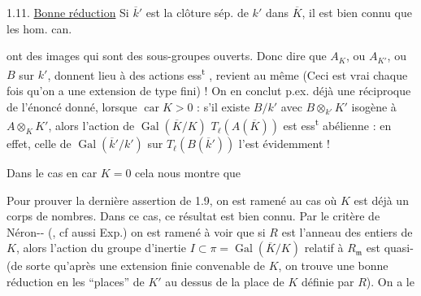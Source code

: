 
1.11. \uline{Bonne réduction}  Si $\overline k'$ est la clôture sép. de $k'$ dans $\overline K$, il est bien connu que les hom. can.

ont des images qui sont des sous-groupes ouverts. Donc  dire que $A_K$, ou $A_{K'}$, ou $B$ sur $k'$, donnent lieu à des actions ess\textsuperscript{t}   , revient au même (Ceci est vrai chaque fois qu'on a une extension de type fini\unsure{\ldots}) !  On en conclut p.ex. déjà une réciproque  de l'énoncé donné, lorsque $\operatorname{car} K>0$  : s'il existe $B/k'$ avec $B\otimes_{k'}K'$ isogène à $A\otimes_K K'$, alors l'action de  $\operatorname{Gal}(\overline K/K)$  $T_\ell(A(\overline K))$ est  ess\textsuperscript{t} abélienne : en effet, celle de  \deleted{\unsure{$\xi$}} $\operatorname{Gal}(\overline k'/k')$  sur $T_\ell(B(\overline k'))$ l'est évidemment !

Dans le cas en car $K=0$ cela nous montre que

Pour prouver la dernière assertion de 1.9, on est ramené  au cas où $K$ est déjà un corps de nombres. Dans ce cas,    ce résultat est bien connu. Par   le critère de Néron-- (\unsure{[\quad \S\ S., th.\ 2]|[\quad \S\ S., T.\ 2]}, cf aussi Exp.\quad) on est ramené à voir que si $R$ est l'anneau des entiers de $K$, alors  l'action du groupe d'inertie $I\subset\pi=\operatorname{Gal}(\overline K/K)$ relatif à $R_{\mathfrak m}$ est quasi- (de sorte qu'après une extension finie convenable  de $K$, on
trouve une bonne réduction en les  ``places'' de $K'$ au dessus de la place de $K$ définie par $R$). On a le

